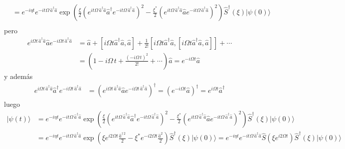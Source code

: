 \begin{align*}
                        & = e^{-i\eta t} e^{-it \Omega \,\hat{a}^{\dagger}\hat{a}}  \exp\left(\frac{\xi}{2}\left(e^{it \Omega \,\hat{a}^{\dagger}\hat{a}}\hat{a}^{\dagger}e^{-it \Omega \,\hat{a}^{\dagger}\hat{a}}\right)^{2} - \frac{\xi^{*}}{2}\left(e^{it \Omega \,\hat{a}^{\dagger}\hat{a}} \hat{a} e^{-it \Omega \,\hat{a}^{\dagger}\hat{a}}\right)^{2} \right)  \hat{S}^{\dagger}(\xi)\vert \psi(0)\rangle \\
\end{align*}
pero
\begin{align*}
  e^{i\Omega t \,\hat{a}^{\dagger}\hat{a}}\hat{a} e^{-i\Omega t \,\hat{a}^{\dagger}\hat{a}} & = \hat{a} + \left[i\Omega t\hat{a}^{\dagger}\hat{a},\hat{a}\right] + \frac{1}{2!} \left[i\Omega t\hat{a}^{\dagger}\hat{a},\left[i\Omega t\hat{a}^{\dagger}\hat{a},\hat{a}\right]\right]+\cdots \\
                                                                                            & = \left(1-i\Omega\,t+\frac{(-i\Omega\,t)^{2}}{2!}+\cdots\right)\hat{a} = e^{-i\Omega t} \hat{a}
\end{align*}
y además
\begin{align*}
  e^{i\Omega t \,\hat{a}^{\dagger}\hat{a}}\hat{a}^{\dagger} e^{-i\Omega t \,\hat{a}^{\dagger}\hat{a}} & = \left(e^{i\Omega t \,\hat{a}^{\dagger}\hat{a}}\hat{a} e^{-i\Omega t \,\hat{a}^{\dagger}\hat{a}}\right)^{\dagger} = \left(e^{-i\Omega t}\hat{a}\right)^{\dagger} = e^{i\Omega t}\hat{a}^{\dagger}
\end{align*}
luego
\begin{align*}
  \vert \psi(t) \rangle & = e^{-i\eta t} e^{-it \Omega \,\hat{a}^{\dagger}\hat{a}}  \exp\left(\frac{\xi}{2}\left(e^{it \Omega \,\hat{a}^{\dagger}\hat{a}}\hat{a}^{\dagger}e^{-it \Omega \,\hat{a}^{\dagger}\hat{a}}\right)^{2} - \frac{\xi^{*}}{2}\left(e^{it \Omega \,\hat{a}^{\dagger}\hat{a}} \hat{a} e^{-it \Omega \,\hat{a}^{\dagger}\hat{a}}\right)^{2} \right)  \hat{S}^{\dagger}(\xi)\vert \psi(0)\rangle \\
                        & = e^{-i\eta t} e^{-it \Omega \,\hat{a}^{\dagger}\hat{a}}  \exp\left(\xi e^{i2\Omega t} \frac{\hat{a}^{\dagger\,2}}{2} - \xi^{*} e^{-i2\Omega t} \frac{\hat{a}^{2}}{2}  \right)  \hat{S}^{\dagger}(\xi)\vert \psi(0)\rangle = e^{-i\eta t} e^{-it \Omega \,\hat{a}^{\dagger}\hat{a}} \hat{S}\left(\xi e^{i2\Omega t} \right)  \hat{S}^{\dagger}(\xi)\vert \psi(0)\rangle
\end{align*}
